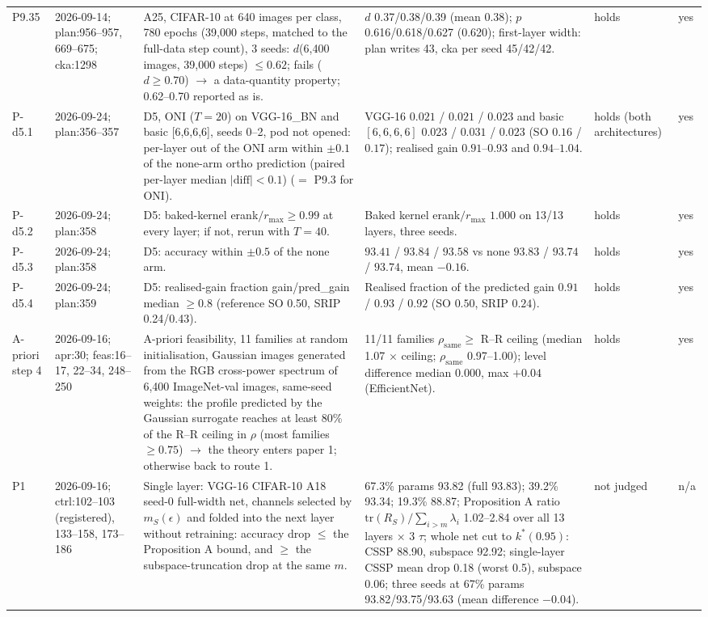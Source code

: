 \begin{longtable}{p{1.1cm}p{1.4cm}p{6.2cm}p{4.6cm}p{2.0cm}p{1.6cm}}
P9.35 & 2026-09-14; plan:956--957, 669--675; cka:1298 & A25, CIFAR-10 at 640 images per class, 780 epochs (39,000 steps, matched to the full-data step count), 3 seeds: $d$(6,400 images, 39,000 steps) $\le 0.62$; fails ($d \ge 0.70$) $\to$ a data-quantity property; 0.62--0.70 reported as is. & $d$ 0.37/0.38/0.39 (mean 0.38); $p$ 0.616/0.618/0.627 (0.620); first-layer width: plan writes 43, cka per seed 45/42/42. & holds & yes \\
P-d5.1 & 2026-09-24; plan:356--357 & D5, ONI ($T = 20$) on VGG-16\_BN and basic [6,6,6,6], seeds 0--2, pod not opened: per-layer out of the ONI arm within $\pm 0.1$ of the none-arm ortho prediction (paired per-layer median $|\mathrm{diff}| < 0.1$) ($=$ P9.3 for ONI). & VGG-16 $0.021$ / $0.021$ / $0.023$ and basic $[6,6,6,6]$ $0.023$ / $0.031$ / $0.023$ (SO $0.16$ / $0.17$); realised gain $0.91$--$0.93$ and $0.94$--$1.04$. & holds (both architectures) & yes \\
P-d5.2 & 2026-09-24; plan:358 & D5: baked-kernel erank$/r_{\max} \ge 0.99$ at every layer; if not, rerun with $T = 40$. & Baked kernel erank$/r_{\max}$ $1.000$ on 13/13 layers, three seeds. & holds & yes \\
P-d5.3 & 2026-09-24; plan:358 & D5: accuracy within $\pm 0.5$ of the none arm. & $93.41$ / $93.84$ / $93.58$ vs none $93.83$ / $93.74$ / $93.74$, mean $-0.16$. & holds & yes \\
P-d5.4 & 2026-09-24; plan:359 & D5: realised-gain fraction gain/pred\_gain median $\ge 0.8$ (reference SO 0.50, SRIP 0.24/0.43). & Realised fraction of the predicted gain $0.91$ / $0.93$ / $0.92$ (SO $0.50$, SRIP $0.24$). & holds & yes \\
A-priori step 4 & 2026-09-16; apr:30; feas:16--17, 22--34, 248--250 & A-priori feasibility, 11 families at random initialisation, Gaussian images generated from the RGB cross-power spectrum of 6,400 ImageNet-val images, same-seed weights: the profile predicted by the Gaussian surrogate reaches at least 80\% of the R--R ceiling in $\rho$ (most families $\ge 0.75$) $\to$ the theory enters paper 1; otherwise back to route 1. & 11/11 families $\rho_{\mathrm{same}} \ge$ R--R ceiling (median 1.07 $\times$ ceiling; $\rho_{\mathrm{same}}$ 0.97--1.00); level difference median 0.000, max $+0.04$ (EfficientNet). & holds & yes \\
P1 & 2026-09-16; ctrl:102--103 (registered), 133--158, 173--186 & Single layer: VGG-16 CIFAR-10 A18 seed-0 full-width net, channels selected by $m_S(\epsilon)$ and folded into the next layer without retraining: accuracy drop $\le$ the Proposition A bound, and $\ge$ the subspace-truncation drop at the same $m$. & 67.3\% params 93.82 (full 93.83); 39.2\% 93.34; 19.3\% 88.87; Proposition A ratio $\mathrm{tr}(R_S)/\sum_{i>m}\lambda_i$ 1.02--2.84 over all 13 layers $\times$ 3 $\tau$; whole net cut to $k^*(0.95)$: CSSP 88.90, subspace 92.92; single-layer CSSP mean drop 0.18 (worst 0.5), subspace 0.06; three seeds at 67\% params 93.82/93.75/93.63 (mean difference $-0.04$). & not judged & n/a \\

\end{longtable}
